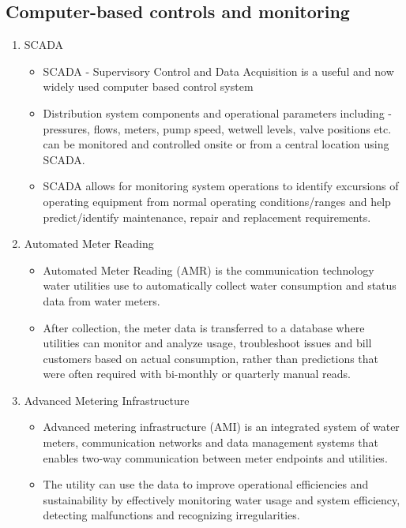 \subsection{Computer-based controls and monitoring} 
\begin{enumerate}
\item SCADA 
\begin{itemize}
\item SCADA - Supervisory Control and Data Acquisition is a  useful and now widely used  computer based control system
\item Distribution system components and operational parameters including - pressures, flows, meters, pump speed, wetwell levels, valve positions etc. can be monitored and controlled onsite or from a central location using SCADA.
\item SCADA allows for monitoring system operations to identify excursions of operating equipment from normal operating conditions/ranges and help predict/identify maintenance, repair and replacement requirements.
\end{itemize}
\item Automated Meter Reading 
\begin{itemize}
\item  Automated Meter Reading (AMR) is the communication technology water utilities use to automatically collect water consumption and status data from water meters. 
\item After collection, the meter data is transferred to a database where utilities can monitor and analyze usage, troubleshoot issues and bill customers based on actual consumption, rather than predictions that were often required with bi-monthly or quarterly manual reads.
\end{itemize}
\item Advanced Metering Infrastructure 
\begin{itemize}
\item Advanced metering infrastructure (AMI) is an integrated system of water meters, communication networks and data management systems that enables two-way communication between meter endpoints and utilities.  
\item The utility can use the data to improve operational efficiencies and sustainability by effectively monitoring water usage and system efficiency, detecting malfunctions and recognizing irregularities.
\end{itemize}
\end{enumerate}

